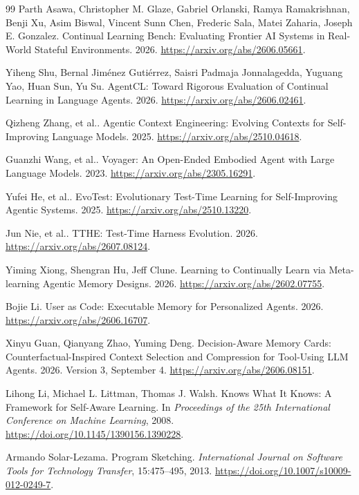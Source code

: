 \begin{thebibliography}{99}
Parth Asawa, Christopher M. Glaze, Gabriel Orlanski, Ramya Ramakrishnan, Benji Xu, Asim Biswal, Vincent Sunn Chen, Frederic Sala, Matei Zaharia, Joseph E. Gonzalez.
Continual Learning Bench: Evaluating Frontier AI Systems in Real-World Stateful Environments.
2026.
\url{https://arxiv.org/abs/2606.05661}.

Yiheng Shu, Bernal Jim{\'e}nez Guti{\'e}rrez, Saisri Padmaja Jonnalagedda, Yuguang Yao, Huan Sun, Yu Su.
{AgentCL}: Toward Rigorous Evaluation of Continual Learning in Language Agents.
2026.
\url{https://arxiv.org/abs/2606.02461}.

Qizheng Zhang, et al..
Agentic Context Engineering: Evolving Contexts for Self-Improving Language Models.
2025.
\url{https://arxiv.org/abs/2510.04618}.

Guanzhi Wang, et al..
Voyager: An Open-Ended Embodied Agent with Large Language Models.
2023.
\url{https://arxiv.org/abs/2305.16291}.

Yufei He, et al..
{EvoTest}: Evolutionary Test-Time Learning for Self-Improving Agentic Systems.
2025.
\url{https://arxiv.org/abs/2510.13220}.

Jun Nie, et al..
{TTHE}: Test-Time Harness Evolution.
2026.
\url{https://arxiv.org/abs/2607.08124}.

Yiming Xiong, Shengran Hu, Jeff Clune.
Learning to Continually Learn via Meta-learning Agentic Memory Designs.
2026.
\url{https://arxiv.org/abs/2602.07755}.

Bojie Li.
User as Code: Executable Memory for Personalized Agents.
2026.
\url{https://arxiv.org/abs/2606.16707}.

Xinyu Guan, Qianyang Zhao, Yuming Deng.
Decision-Aware Memory Cards: Counterfactual-Inspired Context Selection and Compression for Tool-Using {LLM} Agents.
2026.
Version 3, September 4.
\url{https://arxiv.org/abs/2606.08151}.

Lihong Li, Michael L. Littman, Thomas J. Walsh.
Knows What It Knows: A Framework for Self-Aware Learning.
In \emph{Proceedings of the 25th International Conference on Machine Learning}, 2008.
\url{https://doi.org/10.1145/1390156.1390228}.

Armando Solar-Lezama.
Program Sketching.
\emph{International Journal on Software Tools for Technology Transfer}, 15:475--495, 2013.
\url{https://doi.org/10.1007/s10009-012-0249-7}.


\end{thebibliography}
